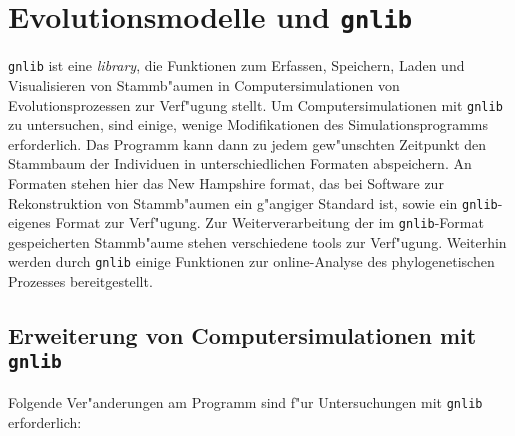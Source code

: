 \documentclass[a4paper, fleqn]{article}
\begin{document}
\section{Evolutionsmodelle und \texttt{gnlib}}

\texttt{gnlib} ist eine \textsl{library}, die Funktionen zum Erfassen,
Speichern, Laden und Visualisieren von Stammb"aumen in Computersimulationen
von Evolutionsprozessen zur Verf"ugung stellt. Um Computersimulationen
mit \texttt{gnlib} zu untersuchen, sind einige, wenige Modifikationen
des Simulationsprogramms erforderlich. Das Programm kann dann zu jedem
gew"unschten Zeitpunkt den Stammbaum der Individuen in unterschiedlichen
Formaten abspeichern. An Formaten stehen hier das New Hampshire format,
das bei Software zur Rekonstruktion von Stammb"aumen ein g"angiger Standard
ist, sowie ein \texttt{gnlib}-eigenes Format zur Verf"ugung. Zur
Weiterverarbeitung der im \texttt{gnlib}-Format gespeicherten Stammb"aume
stehen verschiedene tools zur Verf"ugung. Weiterhin werden durch \texttt{gnlib}
einige Funktionen zur online-Analyse des phylogenetischen Prozesses
bereitgestellt.


\subsection{Erweiterung von Computersimulationen mit \texttt{gnlib}}
\label{function_overview}

Folgende Ver"anderungen am Programm sind f"ur Untersuchungen mit \texttt{gnlib}
erforderlich:
\end{document}
